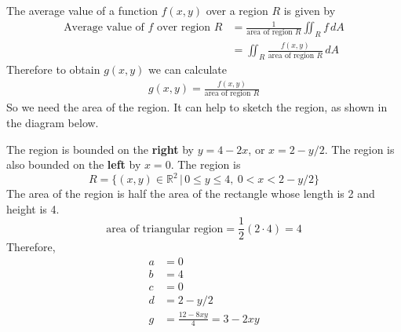     \ifnum {} 
    {\color{DarkBlue} 
    The average value of a function $f(x,y)$ over a region $R$ is given by 
    \begin{align}
        \text{Average value of }f\text{ over region }R &= \frac{1}{\text{area of region }R}\iint_R f \, dA \\&= \iint_R \frac{f(x,y)}{\text{area of region }R} \, dA
    \end{align}
    Therefore to obtain $g(x,y)$ we can calculate
    \begin{align}
        g(x,y) = \frac{f(x,y)}{\text{area of region }R}
    \end{align}
    So we need the area of the region. It can help to sketch the region, as shown in the diagram below. 
       \begin{center}     
    \end{center}     
    The region is bounded on the \textbf{right} by $y=4-2x$, or $x=2-y/2$. The region is also bounded on the \textbf{left} by $x=0$. The region is 
    $$R = \{(x,y) \in \mathbb R^2 \, | \, 0\le y \le 4, \ 0 < x < 2-y/2\}$$
    The area of the region is half the area of the rectangle whose length is 2 and height is 4. 
    $$\text{area of triangular region} = \frac12 ( 2 \cdot 4) = 4$$    
    Therefore, 
    \begin{align}
        a & = 0 \\
        b &= 4 \\
        c &= 0 \\
        d &= 2-y/2 \\
        g &= \frac{12-8xy}{4} = 3 - 2xy
    \end{align}
    }
   \else

